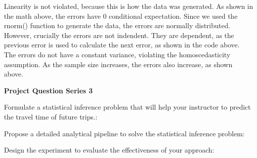 \documentclass[
]{article}
\begin{document}
Linearity is not violated, because this is how the data was generated.
As shown in the math above, the errors have 0 conditional expectation.
Since we used the rnorm() function to generate the data, the errors are
normally distributed. However, crucially the errors are not indendent.
They are dependent, as the previous error is used to calculate the next
error, as shown in the code above. The errors do not have a constant
variance, violating the homoscedasticity assumption. As the sample size
increases, the errors also increase, as shown above.

\textbf{Project Question Series 3}

Formulate a statistical inference problem that will help your instructor
to predict the travel time of future trips.:

Propose a detailed analytical pipeline to solve the statistical
inference problem:

Design the experiment to evaluate the effectiveness of your approach:
\end{document}
